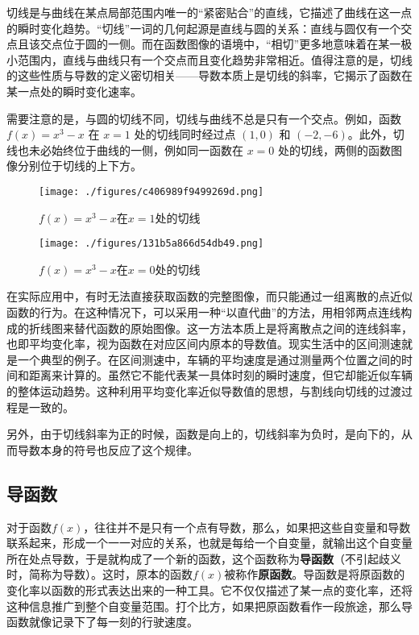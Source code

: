 切线是与曲线在某点局部范围内唯一的“紧密贴合”的直线，它描述了曲线在这一点的瞬时变化趋势。“切线”一词的几何起源是直线与圆的关系：直线与圆仅有一个交点且该交点位于圆的一侧。而在函数图像的语境中，“相切”更多地意味着在某一极小范围内，直线与曲线只有一个交点而且变化趋势非常相近。值得注意的是，切线的这些性质与导数的定义密切相关——导数本质上是切线的斜率，它揭示了函数在某一点处的瞬时变化速率。

需要注意的是，与圆的切线不同，切线与曲线不总是只有一个交点。例如，函数 $f(x) = x^3 - x$ 在 $x = 1$ 处的切线同时经过点 $(1, 0)$ 和 $(-2, -6)$。此外，切线也未必始终位于曲线的一侧，例如同一函数在 $x = 0$ 处的切线，两侧的函数图像分别位于切线的上下方。

\begin{figure}[ht]
\centering
\texttt{[image: ./figures/c406989f9499269d.png]}
\caption{$f(x)=x^3-x$在$x=1$处的切线} \label{fig_HsDerv_1}
\end{figure}

\begin{figure}[ht]
\centering
\texttt{[image: ./figures/131b5a866d54db49.png]}
\caption{$f(x)=x^3-x$在$x=0$处的切线} \label{fig_HsDerv_2}
\end{figure}

在实际应用中，有时无法直接获取函数的完整图像，而只能通过一组离散的点近似函数的行为。在这种情况下，可以采用一种“以直代曲”的方法，用相邻两点连线构成的折线图来替代函数的原始图像。这一方法本质上是将离散点之间的连线斜率，也即平均变化率，视为函数在对应区间内原本的导数值。现实生活中的区间测速就是一个典型的例子。在区间测速中，车辆的平均速度是通过测量两个位置之间的时间和距离来计算的。虽然它不能代表某一具体时刻的瞬时速度，但它却能近似车辆的整体运动趋势。这种利用平均变化率近似导数值的思想，与割线向切线的过渡过程是一致的。

另外，由于切线斜率为正的时候，函数是向上的，切线斜率为负时，是向下的，从而导数本身的符号也反应了这个规律。

\subsection{导函数}

对于函数$f(x)$，往往并不是只有一个点有导数，那么，如果把这些自变量和导数联系起来，形成一个一一对应的关系，也就是每给一个自变量，就输出这个自变量所在处点导数，于是就构成了一个新的函数，这个函数称为\textbf{导函数}（不引起歧义时，简称为导数）。这时，原本的函数$f(x)$被称作\textbf{原函数}。导函数是将原函数的变化率以函数的形式表达出来的一种工具。它不仅仅描述了某一点的变化率，还将这种信息推广到整个自变量范围。打个比方，如果把原函数看作一段旅途，那么导函数就像记录下了每一刻的行驶速度。

